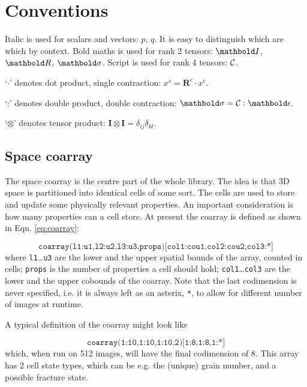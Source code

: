 \section{Conventions}
\label{sec:conventions}

Italic is used for scalars and vectors: {\em{$p$}}, $q$.
It is easy to distinguish which are which by context.
Bold maths is used for rank 2 tensors:
$\tenrtwo{I}$,
$\tenrtwo{R}$,
$\tenrtwo{\sigma}$.
Script is used for rank 4 tensors:
$\mathcal{C}$.

`$\cdot$' denotes dot product, single contraction:
$x^s=\mathbold{R}^c \cdot x^c$.

`:' denotes double product, double contraction:
$\tenrtwo{\sigma} = \tenrfour{C} : \tenrtwo{\epsilon}$.

`$\otimes$' denotes tensor product:
$\mathbold{I}\otimes\mathbold{I}=
\delta_{ij}\delta_{kl}$.

\subsection{Space coarray}
\label{sec:space:coarray}

The space coarray is the centre part of the whole
library.
The idea is that 3D space is partitioned into identical
cells of some sort.
The cells are used to store and update some physically
relevant properties.
An important consideration is how many properties can
a cell store.
At present the coarray is defined as shown in
Eqn. \eqref{eq:coarray}:

\begin{equation}
\texttt{
coarray(l1:u1,l2:u2,l3:u3,props)[col1:cou1,col2:cou2,col3:*]
}
\label{eq:coarray}
\end{equation}
%
where \texttt{l1}\ldots\texttt{u3}
are the lower and the upper
spatial bounds of the array, counted in cells;
\texttt{props} is the number of properties a cell should
hold; \texttt{col1}\ldots\texttt{col3} are the lower
and the upper cobounds of the coarray.
Note that the last codimension is never specified,
i.e. it is always left as an asterix, \texttt{*}, to
allow for different number of images at runtime.

A typical definition of the coarray might look like

\begin{equation}
\texttt{
coarray(1:10,1:10,1:10,2)[1:8,1:8,1:*]
}
\nonumber
\end{equation}
%
which, when run on 512 images, will have the final
codimension of 8.
This array has 2 cell state types, which can be e.g.
the (unique) grain number, and a possible fracture state.

